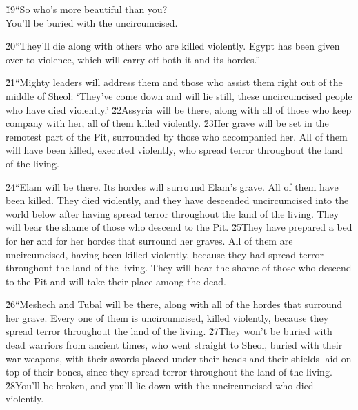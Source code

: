 \begin{poetry}
\poeml \v{19}``So who's more beautiful than you? \\
\poemll    You'll be buried with the uncircumcised.
\end{poetry}

\v{20}``They'll die along with others who are killed violently. Egypt has been given over to violence, which will carry off both it and its hordes.''

\v{21}``Mighty leaders will address them and those who assist them right out of the middle of Sheol: `They've come down and will lie still, these uncircumcised people who have died violently.' \v{22}Assyria will be there, along with all of those who keep company with her, all of them killed violently. \v{23}Her grave will be set in the remotest part of the Pit, surrounded by those who accompanied her. All of them will have been killed, executed violently, who spread terror throughout the land of the living.

\v{24}``Elam will be there. Its hordes will surround Elam's grave. All of them have been killed. They died violently, and they have descended uncircumcised into the world below after having spread terror throughout the land of the living. They will bear the shame of those who descend to the Pit. \v{25}They have prepared a bed for her and for her hordes that surround her graves. All of them are uncircumcised, having been killed violently, because they had spread terror throughout the land of the living. They will bear the shame of those who descend to the Pit and will take their place among the dead.

\v{26}``Meshech and Tubal will be there, along with all of the hordes that surround her grave. Every one of them is uncircumcised, killed violently, because they spread terror throughout the land of the living. \v{27}They won't be buried with dead warriors from ancient times, who went straight to Sheol, buried with their war weapons, with their swords placed under their heads and their shields laid on top of their bones, since they spread terror throughout the land of the living. \v{28}You'll be broken, and you'll lie down with the uncircumcised who died violently.

